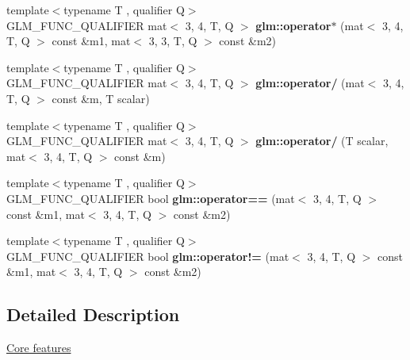 \begin{DoxyCompactItemize}
\item 
\mbox{\label{type__mat3x4_8inl_ac37ea54112e67cd7577cb6a1a7c6bee5}} 
{\footnotesize template$<$typename T , qualifier Q$>$ }\\G\+L\+M\+\_\+\+F\+U\+N\+C\+\_\+\+Q\+U\+A\+L\+I\+F\+I\+ER mat$<$ 3, 4, T, Q $>$ {\bfseries glm\+::operator$\ast$} (mat$<$ 3, 4, T, Q $>$ const \&m1, mat$<$ 3, 3, T, Q $>$ const \&m2)
\item 
\mbox{\label{type__mat3x4_8inl_ac945990f829bca6745446d031f2fa5f5}} 
{\footnotesize template$<$typename T , qualifier Q$>$ }\\G\+L\+M\+\_\+\+F\+U\+N\+C\+\_\+\+Q\+U\+A\+L\+I\+F\+I\+ER mat$<$ 3, 4, T, Q $>$ {\bfseries glm\+::operator/} (mat$<$ 3, 4, T, Q $>$ const \&m, T scalar)
\item 
\mbox{\label{type__mat3x4_8inl_a82d79d8121288d008678655f354e8466}} 
{\footnotesize template$<$typename T , qualifier Q$>$ }\\G\+L\+M\+\_\+\+F\+U\+N\+C\+\_\+\+Q\+U\+A\+L\+I\+F\+I\+ER mat$<$ 3, 4, T, Q $>$ {\bfseries glm\+::operator/} (T scalar, mat$<$ 3, 4, T, Q $>$ const \&m)
\item 
\mbox{\label{type__mat3x4_8inl_ad06d69260cdcbdeca32e7577d667b95d}} 
{\footnotesize template$<$typename T , qualifier Q$>$ }\\G\+L\+M\+\_\+\+F\+U\+N\+C\+\_\+\+Q\+U\+A\+L\+I\+F\+I\+ER bool {\bfseries glm\+::operator==} (mat$<$ 3, 4, T, Q $>$ const \&m1, mat$<$ 3, 4, T, Q $>$ const \&m2)
\item 
\mbox{\label{type__mat3x4_8inl_aedafadf9cc6945a030e2c69bdd7e2744}} 
{\footnotesize template$<$typename T , qualifier Q$>$ }\\G\+L\+M\+\_\+\+F\+U\+N\+C\+\_\+\+Q\+U\+A\+L\+I\+F\+I\+ER bool {\bfseries glm\+::operator!=} (mat$<$ 3, 4, T, Q $>$ const \&m1, mat$<$ 3, 4, T, Q $>$ const \&m2)
\end{DoxyCompactItemize}


\subsection{Detailed Description}
\hyperlink{group__core}{Core features} 